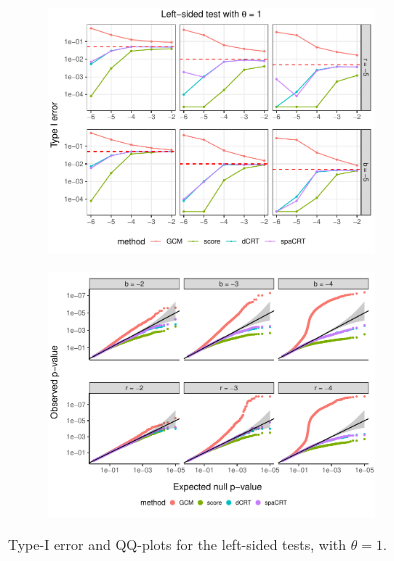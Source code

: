 \documentclass[12pt]{article}
\theoremstyle{definition}
\begin{document}
\begin{figure}
  \centering
  \begin{subfigure}{\textwidth}
    \centering
    \includegraphics[width=0.95\textwidth]{figures-and-tables/simulation/Type-I-error/plot-bin-NB-normal-B-50000-n-5000-5e3-n5-n5-disp-1-Type-I-error-LEFT.pdf}
  \end{subfigure}

  \begin{subfigure}{\textwidth}
    \centering
    \includegraphics[width=0.95\textwidth]{figures-and-tables/simulation/QQ/plot-bin-NB-normal-B-50000-n-5000-5e3-n5-n5-disp-1-QQ-LEFT.pdf}
  \end{subfigure}
  \caption{Type-I error and QQ-plots for the left-sided tests, with $\theta = 1$.}
  \label{fig:simulation-Type-I-error-LEFT-1}
\end{figure}
\end{document}
